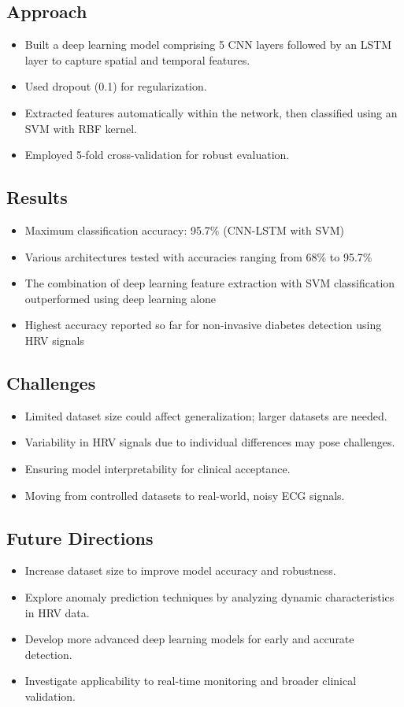 \subsection*{Approach}
\begin{itemize}
    \item Built a deep learning model comprising 5 CNN layers followed by an LSTM layer to capture spatial and temporal features.
    \item Used dropout (0.1) for regularization.
    \item Extracted features automatically within the network, then classified using an SVM with RBF kernel.
    \item Employed 5-fold cross-validation for robust evaluation.
\end{itemize}
\subsection*{Results}
\begin{itemize}
    \item Maximum classification accuracy: 95.7\% (CNN-LSTM with SVM)
    \item Various architectures tested with accuracies ranging from 68\% to 95.7\%
    \item The combination of deep learning feature extraction with SVM classification outperformed using deep learning alone
    \item Highest accuracy reported so far for non-invasive diabetes detection using HRV signals
\end{itemize}

\subsection*{Challenges}
\begin{itemize}
    \item Limited dataset size could affect generalization; larger datasets are needed.
    \item Variability in HRV signals due to individual differences may pose challenges.
    \item Ensuring model interpretability for clinical acceptance.
    \item Moving from controlled datasets to real-world, noisy ECG signals.
\end{itemize}

\subsection*{Future Directions}
\begin{itemize}
    \item Increase dataset size to improve model accuracy and robustness.
    \item Explore anomaly prediction techniques by analyzing dynamic characteristics in HRV data.
    \item Develop more advanced deep learning models for early and accurate detection.
    \item Investigate applicability to real-time monitoring and broader clinical validation.
\end{itemize}


